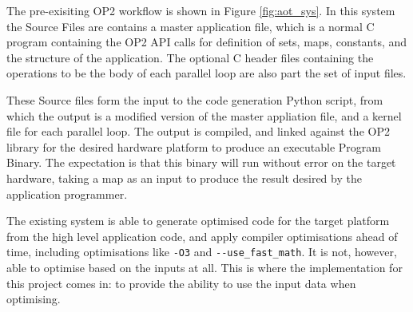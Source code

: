 The pre-exisiting OP2 workflow is shown in Figure \ref{fig:aot_sys}. In this system the Source Files are contains a master application file, which is a normal C program containing the OP2 API calls for definition of sets, maps, constants, and the structure of the application. The optional C header files containing the operations to be the body of each parallel loop are also part the set of input files.
\par
These Source files form the input to the code generation Python script, from which the output is a modified version of the master appliation file, and a kernel file for each parallel loop. The output is compiled, and linked against the OP2 library for the desired hardware platform to produce an executable Program Binary. The expectation is that this binary will run without error on the target hardware, taking a map as an input to produce the result desired by the application programmer.
\par
The existing system is able to generate optimised code for the target platform from the high level application code, and apply compiler optimisations ahead of time, including optimisations like \verb|-O3| and \verb|--use_fast_math|. It is not, however, able to optimise based on the inputs at all. This is where the implementation for this project comes in: to provide the ability to use the input data when optimising.

